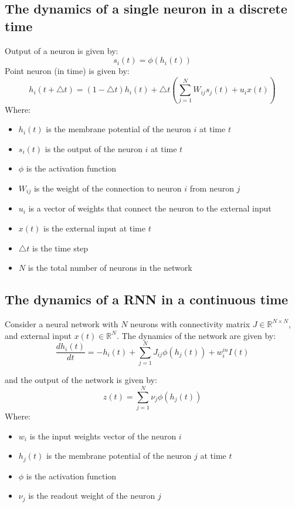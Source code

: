 \documentclass[11pt]{book} %
\begin{document}
\subsection{The dynamics of a single neuron in a discrete time}
Output of a neuron is given by:
\[
    s_i(t) = \phi(h_i(t))
\]
Point neuron (in time) is given by:
\[
    h_i(t + \bigtriangleup  t) = (1 - \bigtriangleup t) h_i(t) + \bigtriangleup t (\sum_{j=1}^N W_{ij} s_j(t) + u_ix(t))
\]
Where:
\begin{itemize}
    \item $h_i(t)$ is the membrane potential of the neuron $i$ at time $t$
    \item $s_i(t)$ is the output of the neuron $i$ at time $t$
    \item $\phi$ is the activation function
    \item $W_{ij}$ is the weight of the connection to neuron $i$ from neuron $j$
    \item $u_i$ is a vector of weights that connect the neuron to the external input
    \item $x(t)$ is the external input at time $t$
    \item $\bigtriangleup t$ is the time step
    \item $N$ is the total number of neurons in the network
\end{itemize}

\subsection{The dynamics of a RNN in a continuous time}
Consider a neural network with $N$ neurons with connectivity matrix $J \in \mathbb{R}^{N \times N}$, and external input $x(t) \in \mathbb{R}^N$.
The dynamics of the network are given by:
\[
    \frac{dh_i(t)}{dt} = -h_i(t) + \sum_{j=1}^N J_{ij} \phi(h_j(t)) + w_i^{in} I(t)
\]

and the output of the network is given by:
\[
    z(t) = \sum_{j=1}^N \nu_j \phi(h_j(t))
\]
Where:
\begin{itemize}
    \item $w_i$ is the input weights vector of the neuron $i$
    \item $h_j(t)$ is the membrane potential of the neuron $j$ at time $t$
    \item $\phi$ is the activation function
    \item $\nu_j$ is the readout weight of the neuron $j$
\end{itemize}
\end{document}

